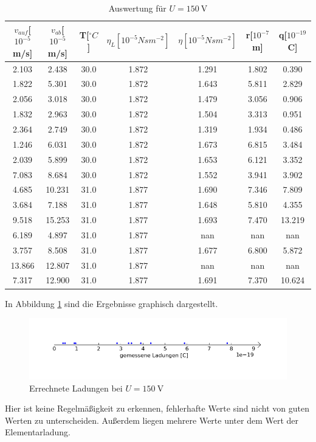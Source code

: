 \documentclass[11pt,ngerman,a4paper]{article}
\begin{document}
\begin{table}[H]
\hspace{-1.cm}
\begin{tabular}{ccccccc}
\toprule
{$v_{auf}$[$10^{-5}$m/s]} &{ $v_{ab}$[$10^{-5}$m/s]} &{ T[$^\circ C$]} &{ $\eta_{L}[10^{-5}Nsm^{-2}]$} &{ $\eta[10^{-5}Nsm^{-2}]$} &{ r[$10^{-7}$m]} &{ q[$10^{-19}$C] }\\
\midrule
2.103 & 2.438 & 30.0 & 1.872 & 1.291 & 1.802 & 0.390\\
1.822 & 5.301 & 30.0 & 1.872 & 1.643 & 5.811 & 2.829\\
2.056 & 3.018 & 30.0 & 1.872 & 1.479 & 3.056 & 0.906\\
1.832 & 2.963 & 30.0 & 1.872 & 1.504 & 3.313 & 0.951\\
2.364 & 2.749 & 30.0 & 1.872 & 1.319 & 1.934 & 0.486\\
1.246 & 6.031 & 30.0 & 1.872 & 1.673 & 6.815 & 3.484\\
2.039 & 5.899 & 30.0 & 1.872 & 1.653 & 6.121 & 3.352\\
7.083 & 8.684 & 30.0 & 1.872 & 1.552 & 3.941 & 3.902\\
4.685 & 10.231 & 31.0 & 1.877 & 1.690 & 7.346 & 7.809\\
3.684 & 7.188 & 31.0 & 1.877 & 1.648 & 5.810 & 4.355\\
9.518 & 15.253 & 31.0 & 1.877 & 1.693 & 7.470 & 13.219\\
6.189 & 4.897 & 31.0 & 1.877 & nan & nan & nan\\
3.757 & 8.508 & 31.0 & 1.877 & 1.677 & 6.800 & 5.872\\
13.866 & 12.807 & 31.0 & 1.877 & nan & nan & nan\\
7.317 & 12.900 & 31.0 & 1.877 & 1.691 & 7.370 & 10.624\\
\bottomrule
\end{tabular}
\label{}
\caption{Auswertung für $U=\SI{150}{\volt}$}
\end{table}
\noindent
In Abbildung \ref{plot2a} sind die Ergebnisse graphisch dargestellt.
\begin{figure}[h]
\hspace{-1.5cm}
\includegraphics[scale=0.9]{plot2a.png}
\caption{Errechnete Ladungen bei $U=\SI{150}{\volt}$}
\label{plot2a}
\end{figure}
Hier ist keine Regelmäßigkeit zu erkennen, fehlerhafte Werte sind nicht von guten Werten zu unterscheiden. Außerdem liegen mehrere Werte unter dem Wert der Elementarladung.
\end{document}
